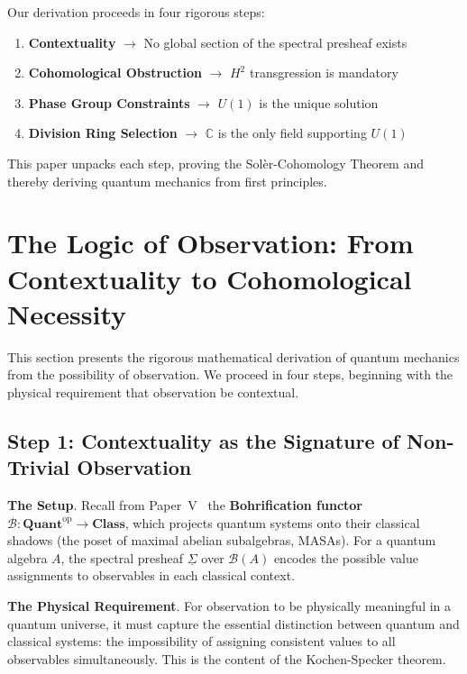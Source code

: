 \documentclass[11pt]{article}
\begin{document}
Our derivation proceeds in four rigorous steps:
\begin{enumerate}
\item \textbf{Contextuality} $\rightarrow$ No global section of the spectral presheaf exists
\item \textbf{Cohomological Obstruction} $\rightarrow$ $H^2$ transgression is mandatory
\item \textbf{Phase Group Constraints} $\rightarrow$ $U(1)$ is the unique solution
\item \textbf{Division Ring Selection} $\rightarrow$ $\mathbb{C}$ is the only field supporting $U(1)$
\end{enumerate}

This paper unpacks each step, proving the Sol\`{e}r-Cohomology Theorem and thereby deriving quantum mechanics from first principles.

\section{The Logic of Observation: From Contextuality to Cohomological Necessity}
\label{the-logic-of-observation}

This section presents the rigorous mathematical derivation of quantum mechanics from the possibility of observation. We proceed in four steps, beginning with the physical requirement that observation be contextual.

\subsection{Step 1: Contextuality as the Signature of Non-Trivial Observation}
\label{step-1-contextuality}

\textbf{The Setup}.
Recall from Paper~V~\cite{PaperV} the \textbf{Bohrification functor} $\mathcal{B}: \mathbf{Quant}^{\text{op}} \to \mathbf{Class}$, which projects quantum systems onto their classical shadows (the poset of maximal abelian subalgebras, MASAs). For a quantum algebra $A$, the spectral presheaf $\underline{\Sigma}$ over $\mathcal{B}(A)$ encodes the possible value assignments to observables in each classical context.

\textbf{The Physical Requirement}.
For observation to be physically meaningful in a quantum universe, it must capture the essential distinction between quantum and classical systems: the impossibility of assigning consistent values to all observables simultaneously. This is the content of the Kochen-Specker theorem.
\end{document}
